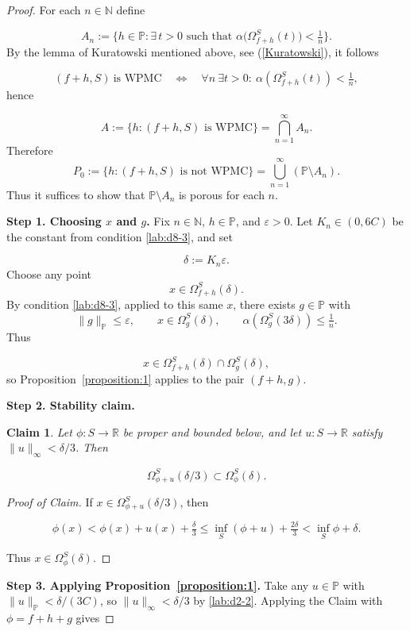 \documentclass[12pt]{article}
\theoremstyle{thmstyleone}%
\newtheorem{claim}{Claim}
\theoremstyle{thmstyletwo}%
\theoremstyle{thmstylethree}%
\begin{document}
{%
{%
\begin{proof}
For each $n\in\mathbb{N}$ define


\[
A_n := \Big\{ h\in\mathbb{P} : \exists\, t>0 \text{ such that }
\alpha\big(\Omega_{f+h}^S(t)\big) < \tfrac1n \Big\}.
\]
By the lemma of Kuratowski mentioned above, see (\ref{Kuratowski}), it follows


\[
(f+h,S)\ \text{is WPMC}
\quad\Longleftrightarrow\quad
\forall n\ \exists t>0:\ \alpha(\Omega_{f+h}^S(t))<\tfrac1n,
\]
hence


\[
A:=\Big\{h:(f+h,S)\text{ is WPMC}\Big\}=\bigcap_{n=1}^\infty A_n.
\]
Therefore
\[
P_0:=\{h:(f+h,S)\text{ is not WPMC}\}
=\bigcup_{n=1}^\infty (\mathbb{P}\setminus A_n).
\]
Thus it suffices to show that $\mathbb{P}\setminus A_n$ is porous for each $n$.

\medskip
\noindent\textbf{Step 1. Choosing $x$ and $g$.}
Fix $n\in\mathbb{N}$, $h\in\mathbb{P}$, and $\varepsilon>0$.  
Let $K_n\in(0,6C)$ be the constant from condition \ref{lab:d8-3}, and set


\[
\delta := K_n\varepsilon.
\]
Choose any point
\[
x\in \Omega_{f+h}^S(\delta).
\]
By condition \ref{lab:d8-3}, applied to this same $x$, there exists $g\in\mathbb{P}$ with
\[
\|g\|_{\mathbb{P}}\le \varepsilon,
\qquad
x\in\Omega_g^S(\delta),
\qquad
\alpha(\Omega_g^S(3\delta))\le \tfrac1n.
\]
Thus


\[
x\in \Omega_{f+h}^S(\delta)\cap \Omega_g^S(\delta),
\]
so Proposition~\ref{proposition:1} applies to the pair $(f+h,g)$.

\medskip
\noindent\textbf{Step 2. Stability claim.}
\begin{claim}
Let $\phi:S\to\mathbb{R}$ be proper and bounded below, and let $u:S\to\mathbb{R}$ satisfy $\|u\|_\infty<\delta/3$. Then


\[
\Omega_{\phi+u}^S(\delta/3)\subset \Omega_\phi^S(\delta).
\]


\end{claim}

\begin{proof}[Proof of Claim]
If $x\in\Omega_{\phi+u}^S(\delta/3)$, then


\[
\phi(x)
< \phi(x)+u(x)+\tfrac{\delta}{3}
\le \inf_S(\phi+u)+\tfrac{2\delta}{3}
< \inf_S\phi+\delta.
\]


Thus $x\in\Omega_\phi^S(\delta)$.
\end{proof}

\medskip
\noindent\textbf{Step 3. Applying Proposition~\ref{proposition:1}.}
Take any $u\in\mathbb{P}$ with $\|u\|_{\mathbb{P}}<\delta/(3C)$, so $\|u\|_\infty<\delta/3$ by \ref{lab:d2-2}.  
Applying the Claim with $\phi=f+h+g$ gives



\end{proof}}}
\end{document}
